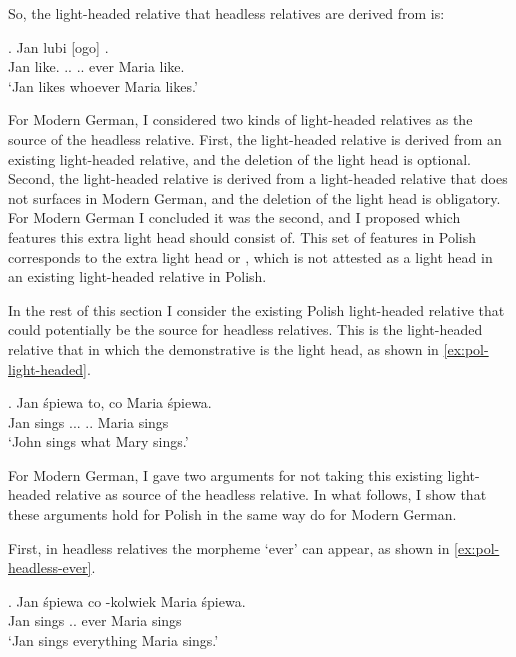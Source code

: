 So, the light-headed relative that headless relatives are derived from is:

\exg. Jan lubi [ogo]    .\\
Jan like.\scsub{[acc]} .. .. ever Maria like.\scsub{[acc]}\\
`Jan likes whoever Maria likes.' \label{ex:pol-elh}

For Modern German, I considered two kinds of light-headed relatives as the source of the headless relative.
First, the light-headed relative is derived from an existing light-headed relative, and the deletion of the light head is optional. Second, the light-headed relative is derived from a light-headed relative that does not surfaces in Modern German, and the deletion of the light head is obligatory.
For Modern German I concluded it was the second, and I proposed which features this extra light head should consist of. This set of features in Polish corresponds to the extra light head  or , which is not attested as a light head in an existing light-headed relative in Polish.

In the rest of this section I consider the existing Polish light-headed relative that could potentially be the source for headless relatives. This is the light-headed relative that in which the demonstrative is the light head, as shown in \ref{ex:pol-light-headed}.

\exg. Jan śpiewa to, co Maria śpiewa.\\
Jan sings ... .. Maria sings\\
`John sings what Mary sings.' \label{ex:pol-light-headed}

For Modern German, I gave two arguments for not taking this existing light-headed relative as source of the headless relative. In what follows, I show that these arguments hold for Polish in the same way do for Modern German.

First, in headless relatives the morpheme  `ever' can appear, as shown in \ref{ex:pol-headless-ever}.

\exg. Jan śpiewa co -kolwiek Maria śpiewa.\\
Jan sings .. ever Maria sings\\
`Jan sings everything Maria sings.' \label{ex:pol-headless-ever}

